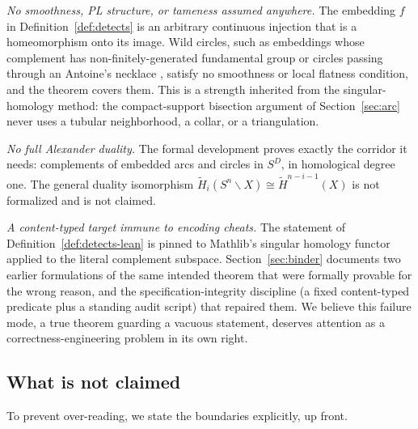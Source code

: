 \documentclass[11pt]{article}
\theoremstyle{definition}
\newcommand{\Sph}[1]{S^{#1}}
\begin{document}
\emph{No smoothness, PL structure, or tameness assumed anywhere.} The embedding $f$ in Definition~\ref{def:detects} is an arbitrary continuous injection that is a homeomorphism onto its image. Wild circles, such as embeddings whose complement has non-finitely-generated fundamental group \cite{foxartin} or circles passing through an Antoine's necklace \cite{antoine}, satisfy no smoothness or local flatness condition, and the theorem covers them. This is a strength inherited from the singular-homology method: the compact-support bisection argument of Section~\ref{sec:arc} never uses a tubular neighborhood, a collar, or a triangulation.

\emph{No full Alexander duality.} The formal development proves exactly the corridor it needs: complements of embedded arcs and circles in $\Sph{D}$, in homological degree one. The general duality isomorphism $\widetilde{H}_i(\Sph{n} \smallsetminus X) \cong \widetilde{H}^{n-i-1}(X)$ is not formalized and is not claimed.

\emph{A content-typed target immune to encoding cheats.} The statement of Definition~\ref{def:detects-lean} is pinned to Mathlib's singular homology functor applied to the literal complement subspace. Section~\ref{sec:binder} documents two earlier formulations of the same intended theorem that were formally provable for the wrong reason, and the specification-integrity discipline (a fixed content-typed predicate plus a standing audit script) that repaired them. We believe this failure mode, a true theorem guarding a vacuous statement, deserves attention as a correctness-engineering problem in its own right.

\subsection{What is not claimed}
\label{sec:nonclaims}

To prevent over-reading, we state the boundaries explicitly, up front.
\end{document}
